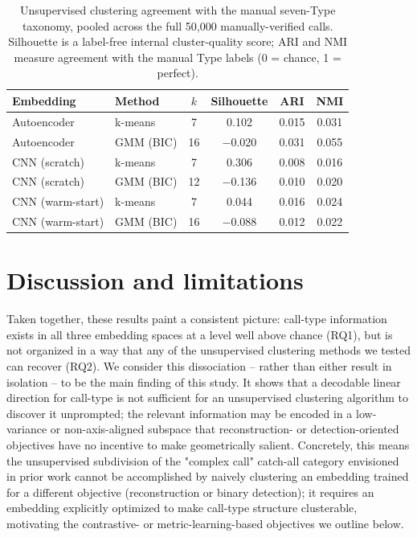 \documentclass{article}
\begin{document}
\begin{table}[t]
  \centering
  \caption{Unsupervised clustering agreement with the manual seven-Type
  taxonomy, pooled across the full 50{,}000 manually-verified calls.
  Silhouette is a label-free internal cluster-quality score; ARI and NMI
  measure agreement with the manual Type labels (0 = chance, 1 = perfect).}
  \label{tab:cluster}
  \begin{tabular}{llcccc}
    \toprule
    Embedding & Method & $k$ & Silhouette & ARI & NMI \\
    \midrule
    Autoencoder     & k-means      & 7  & 0.102  & 0.015 & 0.031 \\
    Autoencoder     & GMM (BIC)    & 16 & $-$0.020 & 0.031 & 0.055 \\
    CNN (scratch)   & k-means      & 7  & 0.306  & 0.008 & 0.016 \\
    CNN (scratch)   & GMM (BIC)    & 12 & $-$0.136 & 0.010 & 0.020 \\
    CNN (warm-start)& k-means      & 7  & 0.044  & 0.016 & 0.024 \\
    CNN (warm-start)& GMM (BIC)    & 16 & $-$0.088 & 0.012 & 0.022 \\
    \bottomrule
  \end{tabular}
\end{table}

\section{Discussion and limitations}
\label{sec:discussion}

Taken together, these results paint a consistent picture: call-type
information exists in all three embedding spaces at a level well above
chance (RQ1), but is not organized in a way that any of the unsupervised
clustering methods we tested can recover (RQ2). We consider this
dissociation -- rather than either result in isolation -- to be the main
finding of this study. It shows that a decodable linear direction for
call-type is not sufficient for an unsupervised clustering algorithm to
discover it unprompted; the relevant information may be encoded in a
low-variance or non-axis-aligned subspace that reconstruction- or
detection-oriented objectives have no incentive to make geometrically
salient. Concretely, this means the unsupervised subdivision of the
"complex call" catch-all category envisioned in prior work
cannot be accomplished by naively clustering an embedding trained for a
different objective (reconstruction or binary detection); it requires an
embedding explicitly optimized to make call-type structure clusterable,
motivating the contrastive- or metric-learning-based objectives we outline
below.
\end{document}
